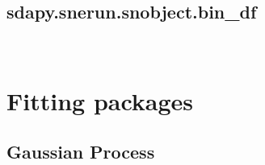 \documentclass[letterpaper,10pt,english]{sphinxmanual}
\begin{document}
\begin{fulllineitems}
\label{\detokenize{generated/sdapy.snerun.snobject.read_c10:sdapy.snerun.snobject.read_c10}}~
\end{fulllineitems}



\subsection{sdapy.snerun.snobject.bin\_df}
\label{\detokenize{generated/sdapy.snerun.snobject.bin_df:sdapy-snerun-snobject-bin-df}}\label{\detokenize{generated/sdapy.snerun.snobject.bin_df::doc}}

\begin{fulllineitems}
\label{\detokenize{generated/sdapy.snerun.snobject.bin_df:sdapy.snerun.snobject.bin_df}}~
\end{fulllineitems}



\section{ \textendash{} Fitting packages}
\label{\detokenize{fitters:fitting-and-gaussian-process-fitting-packages}}\label{\detokenize{fitters:fitters}}\label{\detokenize{fitters::doc}}

\subsection{Gaussian Process}
\label{\detokenize{fitters:gaussian-process}}
\end{document}
